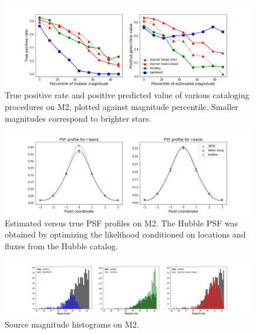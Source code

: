 
\begin{figure}[h]
    \centering
    \includegraphics[width=0.99\textwidth]{figures/summary_statistics_m2.png}
    \caption{True positive rate and positive predicted value of various cataloging
    procedures on M2, plotted against magnitude percentile.
    Smaller magnitudes correspond to brighter stars. }
    \label{fig:summary_stats}
\end{figure}





\begin{figure}[h]
    \centering
    \includegraphics[width=0.99\textwidth]{figures/psf_profiles.png}
    \caption{Estimated versus true PSF profiles on M2. The Hubble PSF was
    obtained by optimizing the likelihood conditioned on locations and fluxes
    from the Hubble catalog. }
    \label{fig:psf_profiles}
\end{figure}

\begin{figure}[h]
    \centering
    \includegraphics[width=0.99\textwidth]{figures/luminosity_fun.png}
    \caption{Source magnitude histograms on M2. }
    \label{fig:luminosity_fun_m2}
\end{figure}

